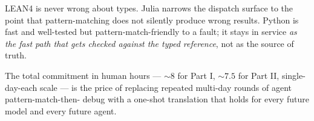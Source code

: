 \documentclass[11pt,a4paper]{article}
\begin{document}
LEAN4 is never wrong about types. Julia narrows the dispatch surface
to the point that pattern-matching does not silently produce wrong
results. Python is fast and well-tested but pattern-match-friendly
to a fault; it stays in service \emph{as the fast path that gets
checked against the typed reference}, not as the source of truth.

The total commitment in human hours --- $\sim 8$ for Part I,
$\sim 7.5$ for Part II, single-day-each scale --- is the price
of replacing repeated multi-day rounds of agent pattern-match-then-
debug with a one-shot translation that holds for every future
model and every future agent.
\end{document}
